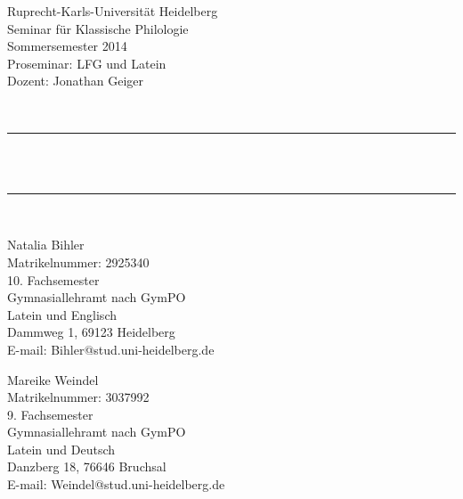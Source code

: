 \begin{titlepage}

\begin{center}


\begin{minipage}{0.55\textwidth}
\begin{flushleft} \small
Ruprecht-Karls-Universität Heidelberg\\
Seminar für Klassische Philologie\\
Sommersemester 2014\\
Proseminar: LFG und Latein \\
Dozent: Jonathan Geiger\\ 
\end{flushleft}
\end{minipage}
\begin{minipage}{0.4\textwidth}
\begin{flushright} \large

\end{flushright}
\end{minipage}
\\[4cm]
\rule{\textwidth}{0.4pt}\\[0.4cm]


 \\[0.1cm]

\rule{\textwidth}{0.4pt}\\[4cm]

\begin{minipage}{0.48\textwidth}
\begin{flushleft} \small
Natalia Bihler\\
Matrikelnummer: 2925340\\
10. Fachsemester\\
Gymnasiallehramt nach GymPO\\
Latein und Englisch\\
Dammweg 1, 69123 Heidelberg\\
E-mail: Bihler@stud.uni-heidelberg.de
\end{flushleft}
\end{minipage}
\begin{minipage}{0.48\textwidth}
\begin{flushright} \small
Mareike Weindel\\
Matrikelnummer: 3037992\\
9. Fachsemester\\
Gymnasiallehramt nach GymPO\\
Latein und Deutsch\\
Danzberg 18, 76646 Bruchsal\\
E-mail: Weindel@stud.uni-heidelberg.de
\end{flushright}
\end{minipage}


\end{center}
\end{titlepage}
